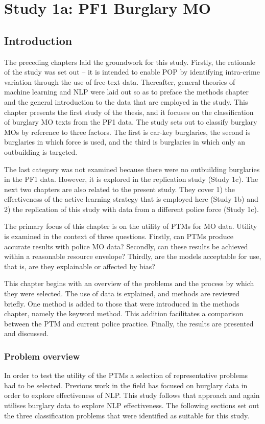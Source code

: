 \chapter{Study 1a: PF1 Burglary MO}
\section{Introduction}

The preceding chapters laid the groundwork for this study. Firstly, the rationale of the study was set out – it is intended to enable POP by identifying intra-crime variation through the use of free-text data. Thereafter, general theories of machine learning and NLP were laid out so as to preface the methods chapter and the general introduction to the data that are employed in the study. This chapter presents the first study of the thesis, and it focuses on the classification of burglary MO texts from the PF1 data. The study sets out to classify burglary MOs by reference to three factors. The first is car-key burglaries, the second is burglaries in which force is used, and the third is burglaries in which only an outbuilding is targeted. 

The last category was not examined because there were no outbuilding burglaries in the PF1 data. However, it is explored in the replication study (Study 1c). The next two chapters are also related to the present study. They cover 1) the effectiveness of the active learning strategy that is employed here (Study 1b) and 2) the replication of this study with data from a different police force (Study 1c).

The primary focus of this chapter is on the utility of PTMs for MO data. Utility is examined in the context of three questions. Firstly, can PTMs produce accurate results with police MO data? Secondly, can these results be achieved within a reasonable resource envelope? Thirdly, are the models acceptable for use, that is,  are they explainable or affected by bias?

This chapter begins with an overview of the problems and the process by which they were selected. The use of data is explained, and methods are reviewed briefly. One method is added to those that were introduced in the methods chapter, namely the keyword method. This addition facilitates a comparison between the PTM and current police practice. Finally, the results are presented and discussed.

\subsection{Problem overview} In order to test the utility of the PTMs a selection of representative problems had to be selected. Previous work in the field has focused on burglary data  \parencite{birks2020unsupervised, sheard2020developing} in order to explore effectiveness of NLP. This study follows that approach and again utilises burglary data to explore NLP effectiveness. The following sections set out the three classification problems that were identified as suitable for this study.

